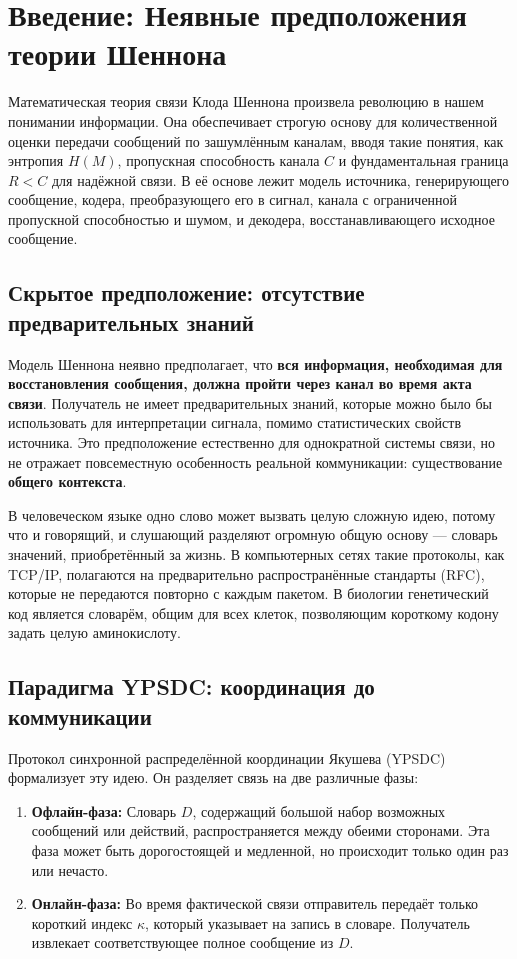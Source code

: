 \documentclass[12pt,a4paper]{article}
\theoremstyle{remark}
\begin{document}
	\section{Введение: Неявные предположения теории Шеннона}
	\label{sec:intro}
	
	Математическая теория связи Клода Шеннона \cite{Shannon1948} произвела революцию в нашем понимании информации. Она обеспечивает строгую основу для количественной оценки передачи сообщений по зашумлённым каналам, вводя такие понятия, как энтропия $H(M)$, пропускная способность канала $C$ и фундаментальная граница $R < C$ для надёжной связи. В её основе лежит модель источника, генерирующего сообщение, кодера, преобразующего его в сигнал, канала с ограниченной пропускной способностью и шумом, и декодера, восстанавливающего исходное сообщение.
	
	\subsection{Скрытое предположение: отсутствие предварительных знаний}
	
	Модель Шеннона неявно предполагает, что \textbf{вся информация, необходимая для восстановления сообщения, должна пройти через канал во время акта связи}. Получатель не имеет предварительных знаний, которые можно было бы использовать для интерпретации сигнала, помимо статистических свойств источника. Это предположение естественно для однократной системы связи, но не отражает повсеместную особенность реальной коммуникации: существование \textbf{общего контекста}.
	
	В человеческом языке одно слово может вызвать целую сложную идею, потому что и говорящий, и слушающий разделяют огромную общую основу — словарь значений, приобретённый за жизнь. В компьютерных сетях такие протоколы, как TCP/IP, полагаются на предварительно распространённые стандарты (RFC), которые не передаются повторно с каждым пакетом. В биологии генетический код является словарём, общим для всех клеток, позволяющим короткому кодону задать целую аминокислоту.
	
	\subsection{Парадигма YPSDC: координация до коммуникации}
	
	Протокол синхронной распределённой координации Якушева (YPSDC) \cite{Yakushev2026a, AppendixB} формализует эту идею. Он разделяет связь на две различные фазы:
	\begin{enumerate}
		\item \textbf{Офлайн-фаза:} Словарь $D$, содержащий большой набор возможных сообщений или действий, распространяется между обеими сторонами. Эта фаза может быть дорогостоящей и медленной, но происходит только один раз или нечасто.
		\item \textbf{Онлайн-фаза:} Во время фактической связи отправитель передаёт только короткий индекс $\kappa$, который указывает на запись в словаре. Получатель извлекает соответствующее полное сообщение из $D$.
	\end{enumerate}
	
\end{document}
